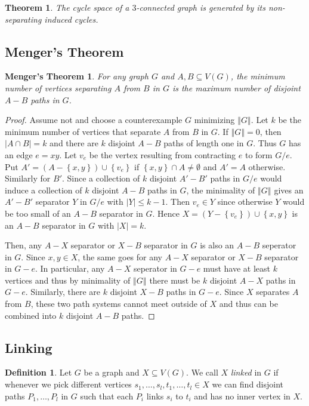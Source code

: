 \documentclass[12pt]{article}
\theoremstyle{plain}
\newtheorem{thm}{Theorem}
\newtheorem*{Menger}{Menger's Theorem}
\theoremstyle{definition}
\newtheorem{defn}{Definition}[section]
\theoremstyle{remark}
\newcommand{\set}[1]{\left\{ #1 \right\}}
\newcommand{\card}[1]{\left|#1\right|}
\newcommand{\size}[1]{\left\Vert#1\right\Vert}
\begin{document}
\begin{thm}
The cycle space of a $3$-connected graph is generated by its non-separating induced cycles.
\end{thm}

\subsection{Menger's Theorem}
\begin{Menger}
For any graph $G$ and $A, B \subseteq V(G)$, the minimum number of vertices separating $A$ from $B$ in $G$ is the maximum number of disjoint $A-B$ paths in $G$.
\end{Menger}
\begin{proof}
Assume not and choose a counterexample $G$ minimizing $\size{G}$.  Let $k$ be the minimum number of vertices that separate $A$ from $B$ in $G$.  If $\size{G} = 0$, then $\card{A \cap B} = k$ and there are $k$ disjoint $A-B$ paths of length one in $G$.  Thus $G$ has an edge $e = xy$.  Let $v_e$ be the vertex resulting from contracting $e$ to form $G / e$.  Put $A' = (A - \set{x, y}) \cup \set{v_e}$ if $\set{x, y} \cap A \neq \emptyset$ and $A' = A$ otherwise.  Similarly for $B'$.  Since a collection of $k$ disjoint $A'-B'$ paths in $G/e$ would induce a collection of $k$ disjoint $A-B$ paths in $G$, the minimality of $\size{G}$ gives an $A'-B'$ separator $Y$ in $G/e$ with $\card{Y} \leq k - 1$.  Then $v_e \in Y$ since otherwise $Y$ would be too small of an $A-B$ separator in $G$.  Hence $X = (Y - \set{v_e}) \cup \set{x, y}$ is an $A-B$ separator in $G$ with $\card{X} = k$.

Then, any $A-X$ separator or $X-B$ separator in $G$ is also an $A-B$ seperator in $G$.  Since $x, y \in X$, the same goes for any $A-X$ separator or $X-B$ separator in $G-e$.  In particular, any $A-X$ seperator in $G-e$ must have at least $k$ vertices and thus by minimality of $\size{G}$ there must be $k$ disjoint $A-X$ paths in $G-e$.  Similarly, there are $k$ disjoint $X-B$ paths in $G-e$.  Since $X$ separates $A$ from $B$, these two path systems cannot meet outside of $X$ and thus can be combined into $k$ disjoint $A-B$ paths.
\end{proof}

\subsection{Linking}
\begin{defn}
Let $G$ be a graph and $X \subseteq V(G)$.  We call $X$ \emph{linked} in $G$ if whenever we pick different vertices $s_1, \ldots, s_l, t_1, \ldots, t_l \in X$ we can find disjoint paths $P_1, \ldots, P_l$ in $G$ such that each $P_i$ links $s_i$ to $t_i$ and has no inner vertex in $X$.
\end{defn}
\end{document}
